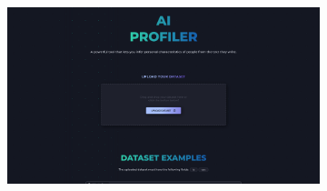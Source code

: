\bigskip
\begin{figure}[H]
	\centering
	\begin{subfigure}[c]{0.74\textwidth}
		\centering
		\includegraphics[width=\textwidth]{imagenes/home.png}
		\label{fig:casouso_home_escritorio}
	\end{subfigure}
	\hfill
	\begin{subfigure}[c]{0.21\textwidth}
		\centering

\end{subfigure}
\end{figure}
